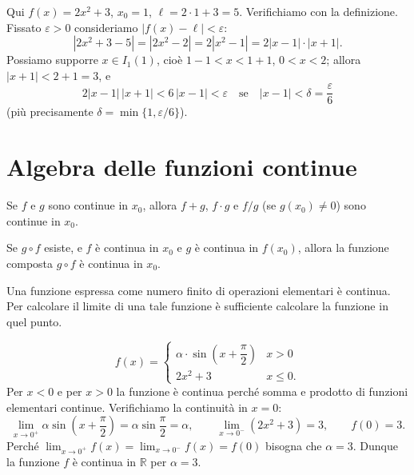 \documentclass[11pt,a4paper]{article}
\begin{document}
\begin{esempio}[$\lim_{x\to 1}(2x^2 + 3) = 5$]
Qui $f(x) = 2x^2 + 3$, $x_0 = 1$, $\ell = 2\cdot 1 + 3 = 5$. Verifichiamo con la definizione. Fissato $\varepsilon > 0$ consideriamo $|f(x) - \ell| < \varepsilon$:
\[
|2x^2 + 3 - 5| = |2x^2 - 2| = 2|x^2 - 1| = 2|x - 1|\cdot|x + 1| .
\]
Possiamo supporre $x \in I_1(1)$, cioè $1 - 1 < x < 1 + 1$, $0 < x < 2$; allora $|x + 1| < 2 + 1 = 3$, e
\[
2|x - 1|\,|x + 1| < 6\,|x - 1| < \varepsilon \quad\text{se}\quad |x - 1| < \delta = \frac{\varepsilon}{6}
\]
(più precisamente $\delta = \min\{1, \varepsilon/6\}$).
\end{esempio}

\section{Algebra delle funzioni continue}

\begin{teorema}
Se $f$ e $g$ sono continue in $x_0$, allora $f + g$, $f \cdot g$ e $f/g$ (se $g(x_0) \neq 0$) sono continue in $x_0$.
\end{teorema}

\begin{teorema}
Se $g \circ f$ esiste, e $f$ è continua in $x_0$ e $g$ è continua in $f(x_0)$, allora la funzione composta $g \circ f$ è continua in $x_0$.
\end{teorema}

\begin{osservazione}[Conseguenza]
Una funzione espressa come numero finito di operazioni elementari è continua. Per calcolare il limite di una tale funzione è sufficiente calcolare la funzione in quel punto.
\end{osservazione}

\begin{esempio}
\[
f(x) = \begin{cases} \alpha \cdot \sin\!\left(x + \dfrac{\pi}{2}\right) & x > 0 \\[2mm] 2x^2 + 3 & x \le 0 .\end{cases}
\]
Per $x < 0$ e per $x > 0$ la funzione è continua perché somma e prodotto di funzioni elementari continue. Verifichiamo la continuità in $x = 0$:
\[
\lim_{x\to 0^+} \alpha \sin\!\left(x + \frac{\pi}{2}\right) = \alpha \sin\frac{\pi}{2} = \alpha, \qquad
\lim_{x\to 0^-} (2x^2 + 3) = 3, \qquad f(0) = 3 .
\]
Perché $\lim_{x\to 0^+} f(x) = \lim_{x\to 0^-} f(x) = f(0)$ bisogna che $\alpha = 3$. Dunque la funzione $f$ è continua in $\mathbb{R}$ per $\alpha = 3$.
\end{esempio}
\end{document}
